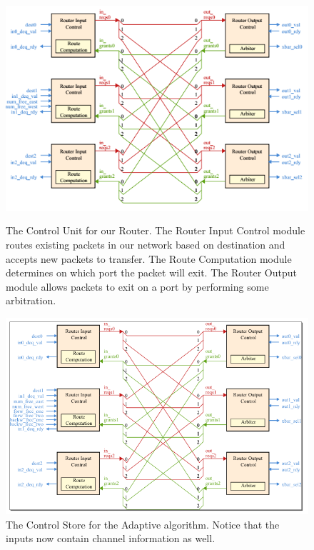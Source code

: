 \documentclass[10pt]{article}
\begin{document}
\begin{figure}[h]
	\centering
	\includegraphics[scale=0.7]{baselinectrl}
	\label{fig:ctrl}
	\caption
	{
		The Control Unit for our Router.
		The Router Input Control module routes existing packets in our network 
		based on destination and accepts new packets to transfer.
		The Route Computation module determines on which port the packet will
		exit.
		The Router Output module allows packets to exit on a port by performing
		some arbitration. 
	}
\end{figure}

\begin{figure}[h]
	\centering
	\includegraphics[scale=0.7]{altctrl}
	\caption{The Control Store for the Adaptive algorithm. 
			 Notice that the inputs now contain channel information as well.}
	\label{fig:altctrl}
\end{figure}
\end{document}
